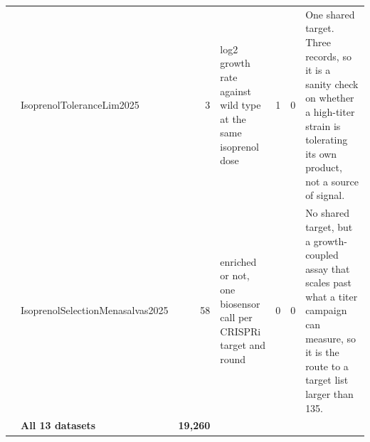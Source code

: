 \begin{landscape}
\begin{longtable}{@{}r >{\raggedright\arraybackslash}p{29mm} r >{\raggedright\arraybackslash}p{40mm} r r >{\raggedright\arraybackslash}p{88mm}@{}}
\addlinespace[2pt]
12 & Isoprenol\allowbreak Tolerance\allowbreak Lim2025 & 3 & log2 growth rate against wild type at the same isoprenol dose & 1 & 0 & One shared target. Three records, so it is a sanity check on whether a high-titer strain is tolerating its own product, not a source of signal. \\
\addlinespace[2pt]
13 & Isoprenol\allowbreak Selection\allowbreak Menasalvas2025 & 58 & enriched or not, one biosensor call per CRISPRi target and round & 0 & 0 & No shared target, but a growth-coupled assay that scales past what a titer campaign can measure, so it is the route to a target list larger than 135. \\
\addlinespace[2pt]
\midrule
 & \textbf{All 13 datasets} & \textbf{19,260} & & & & \\
\end{longtable}
\endgroup
\end{landscape}
